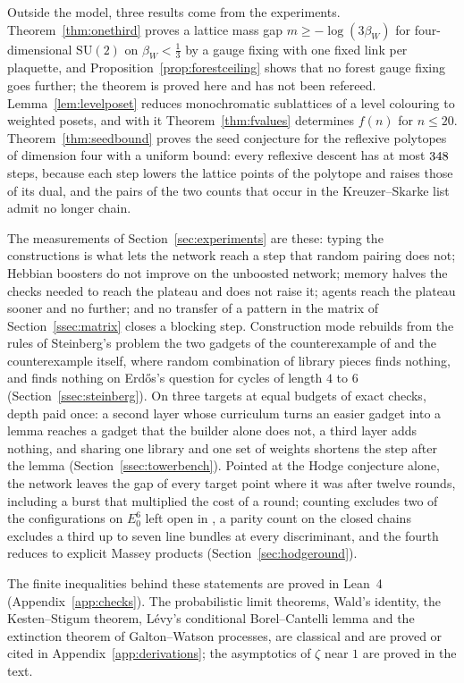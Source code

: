 Outside the model, three results come from the experiments. Theorem~\ref{thm:onethird} proves a lattice mass gap $m\ge-\log(3\beta_{W})$ for four-dimensional $\mathrm{SU}(2)$ on $\beta_{W}<\frac13$ by a gauge fixing with one fixed link per plaquette, and Proposition~\ref{prop:forestceiling} shows that no forest gauge fixing goes further; the theorem is proved here and has not been refereed. Lemma~\ref{lem:levelposet} reduces monochromatic sublattices of a level colouring to weighted posets, and with it Theorem~\ref{thm:fvalues} determines $f(n)$ for $n\le20$. Theorem~\ref{thm:seedbound} proves the seed conjecture for the reflexive polytopes of dimension four with a uniform bound: every reflexive descent has at most $348$ steps, because each step lowers the lattice points of the polytope and raises those of its dual, and the pairs of the two counts that occur in the Kreuzer--Skarke list admit no longer chain.

The measurements of Section~\ref{sec:experiments} are these: typing the constructions is what lets the network reach a step that random pairing does not; Hebbian boosters do not improve on the unboosted network; memory halves the checks needed to reach the plateau and does not raise it; agents reach the plateau sooner and no further; and no transfer of a pattern in the matrix of Section~\ref{ssec:matrix} closes a blocking step. Construction mode rebuilds from the rules of Steinberg's problem the two gadgets of the counterexample of \cite{CHK17} and the counterexample itself, where random combination of library pieces finds nothing, and finds nothing on Erd\H{o}s's question for cycles of length $4$ to $6$ (Section~\ref{ssec:steinberg}). On three targets at equal budgets of exact checks, depth paid once: a second layer whose curriculum turns an easier gadget into a lemma reaches a gadget that the builder alone does not, a third layer adds nothing, and sharing one library and one set of weights shortens the step after the lemma (Section~\ref{ssec:towerbench}). Pointed at the Hodge conjecture alone, the network leaves the gap of every target point where it was after twelve rounds, including a burst that multiplied the cost of a round; counting excludes two of the configurations on $E_{0}^{6}$ left open in \cite{BB26c}, a parity count on the closed chains excludes a third up to seven line bundles at every discriminant, and the fourth reduces to explicit Massey products (Section~\ref{sec:hodgeround}).

The finite inequalities behind these statements are proved in Lean~4 (Appendix~\ref{app:checks}). The probabilistic limit theorems, Wald's identity, the Kesten--Stigum theorem, L\'evy's conditional Borel--Cantelli lemma and the extinction theorem of Galton--Watson processes, are classical and are proved or cited in Appendix~\ref{app:derivations}; the asymptotics of $\zeta$ near $1$ are proved in the text.


